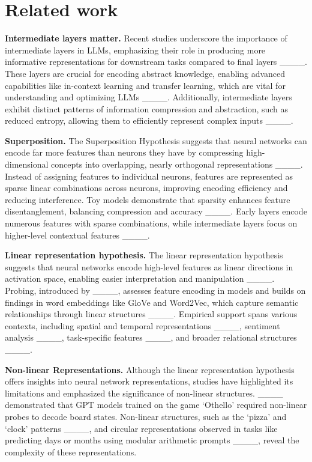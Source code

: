 \section{Related work}
\label{sec:related work} 

\textbf{Intermediate layers matter.}
Recent studies underscore the importance of intermediate layers in LLMs, emphasizing their role in producing more informative representations for downstream tasks compared to final layers ____. These layers are crucial for encoding abstract knowledge, enabling advanced capabilities like in-context learning and transfer learning, which are vital for understanding and optimizing LLMs ____. Additionally, intermediate layers exhibit distinct patterns of information compression and abstraction, such as reduced entropy, allowing them to efficiently represent complex inputs ____.

\textbf{Superposition.}
The Superposition Hypothesis suggests that neural networks can encode far more features than neurons they have by compressing high-dimensional concepts into overlapping, nearly orthogonal representations ____. Instead of assigning features to individual neurons, features are represented as sparse linear combinations across neurons, improving encoding efficiency and reducing interference. Toy models demonstrate that sparsity enhances feature disentanglement, balancing compression and accuracy ____. Early layers encode numerous features with sparse combinations, while intermediate layers focus on higher-level contextual features ____.  

\textbf{Linear representation hypothesis.} The linear representation hypothesis suggests that neural networks encode high-level features as linear directions in activation space, enabling easier interpretation and manipulation ____. Probing, introduced by ____, assesses feature encoding in models and builds on findings in word embeddings like GloVe and Word2Vec, which capture semantic relationships through linear structures ____. Empirical support spans various contexts, including spatial and temporal representations ____, sentiment analysis ____, task-specific features ____, and broader relational structures ____.

\textbf{Non-linear Representations.} Although the linear representation hypothesis offers insights into neural network representations, studies have highlighted its limitations and emphasized the significance of non-linear structures. ____ demonstrated that GPT models trained on the game `Othello' required non-linear probes to decode board states. Non-linear structures, such as the `pizza' and `clock' patterns ____, and circular representations observed in tasks like predicting days or months using modular arithmetic prompts ____, reveal the complexity of these representations.